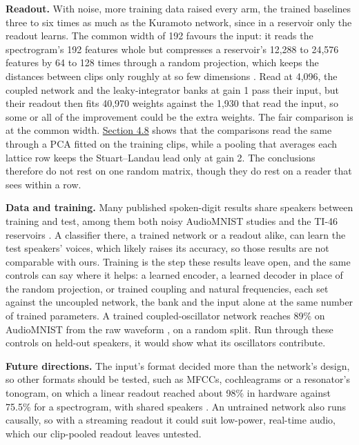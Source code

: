 \documentclass{article}
\begin{document}
\textbf{Readout.} With noise, more training data raised every arm, the
trained baselines three to six times as much as the Kuramoto network,
since in a reservoir only the readout learns. The common width of 192
favours the input: it reads the spectrogram's 192 features whole but
compresses a reservoir's 12,288 to 24,576 features by 64 to 128 times
through a random projection, which keeps the distances between clips
only roughly at so few dimensions \citep{johnson1984}. Read at 4,096,
the coupled network and the leaky-integrator banks at gain 1 pass their
input, but their readout then fits 40,970 weights against the 1,930 that
read the input, so some or all of the improvement could be the extra
weights. The fair comparison is at the common width.
\hyperref[sec-4-8]{Section 4.8} shows that the comparisons read the same
through a PCA fitted on the training clips, while a pooling that
averages each lattice row keeps the Stuart--Landau lead only at gain 2.
The conclusions therefore do not rest on one random matrix, though they
do rest on a reader that sees within a row.

\textbf{Data and training.} Many published spoken-digit results share
speakers between training and test, among them both noisy AudioMNIST
studies \citep{beoletto2026, young2026} and the TI-46 reservoirs
\citep{torrejon2017, opala2019, coulombe2017}. A classifier there, a
trained network or a readout alike, can learn the test speakers' voices,
which likely raises its accuracy, so those results are not comparable
with ours. Training is the step these results leave open, and the same
controls can say where it helps: a learned encoder, a learned decoder in
place of the random projection, or trained coupling and natural
frequencies, each set against the uncoupled network, the bank and the
input alone at the same number of trained parameters. A trained
coupled-oscillator network reaches 89\% on AudioMNIST from the raw
waveform \citep{chandravadia2026}, on a random split. Run through these
controls on held-out speakers, it would show what its oscillators
contribute.

\textbf{Future directions.} The input's format decided more than the
network's design, so other formats should be tested, such as MFCCs,
cochleagrams or a resonator's tonogram, on which a linear readout
reached about 98\% in hardware against 75.5\% for a spectrogram, with
shared speakers \citep{beoletto2026}. An untrained network also runs
causally, so with a streaming readout it could suit low-power, real-time
audio, which our clip-pooled readout leaves untested.
\end{document}
